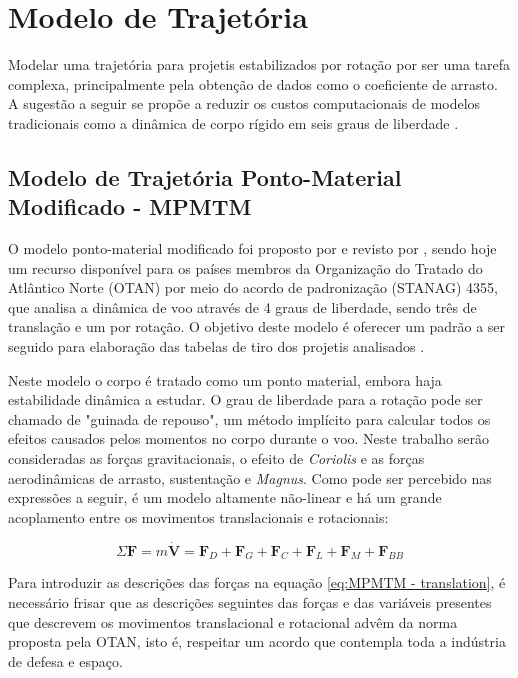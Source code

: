 \chapter{Modelo de Trajetória}\label{cap:trajetoria}
\graphicspath{{chapter-05/img-cap05/}}

Modelar uma trajetória para projetis estabilizados por rotação por ser uma tarefa complexa, principalmente pela obtenção de dados como o coeficiente de arrasto. A sugestão a seguir se propõe a reduzir os custos computacionais de modelos tradicionais como a dinâmica de corpo rígido em seis graus de liberdade \cite{McCoy2012}.

\section{Modelo de Trajetória Ponto-Material Modificado - MPMTM}
\label{subsec:MPMTM}

O modelo ponto-material modificado foi proposto por \citeauthor{Lieske1966} e revisto por \citeauthor{Baranowski2013-3}, sendo hoje um recurso disponível para os países membros da Organização do Tratado do Atlântico Norte (OTAN) \cite{stanag4355} por meio do acordo de padronização (STANAG) 4355, que analisa a dinâmica de voo através de 4 graus de liberdade, sendo três de translação e um por rotação. O objetivo deste modelo é oferecer um padrão a ser seguido para elaboração das tabelas de tiro dos projetis analisados \cite{McCoy2012,Carlucci2018}.

Neste modelo o corpo é tratado como um ponto material, embora haja estabilidade dinâmica a estudar. O grau de liberdade para a rotação pode ser chamado de "guinada de repouso", um método implícito para calcular todos os efeitos causados pelos momentos no corpo durante o voo. Neste trabalho serão consideradas as forças gravitacionais, o efeito de \textit{Coriolis} e as forças aerodinâmicas de arrasto, sustentação e \textit{Magnus}. Como pode ser percebido nas expressões a seguir, é um modelo altamente não-linear e há um grande acoplamento entre os movimentos translacionais e rotacionais:

\begin{equation}
    \label{eq:MPMTM - translation}
    \Sigma\boldsymbol{F} = m \dot{\boldsymbol{V}} = \boldsymbol{F}_{D} + \boldsymbol{F}_{G} + \boldsymbol{F}_{C} + \boldsymbol{F}_{L} + \boldsymbol{F}_{M} + \boldsymbol{F}_{BB}
\end{equation}

Para introduzir as descrições das forças na equação \ref{eq:MPMTM - translation}, é necessário frisar que as descrições seguintes das forças e das variáveis presentes que descrevem os movimentos translacional e rotacional advêm da norma proposta pela OTAN, isto é, respeitar um acordo que contempla toda a indústria de defesa e espaço.

